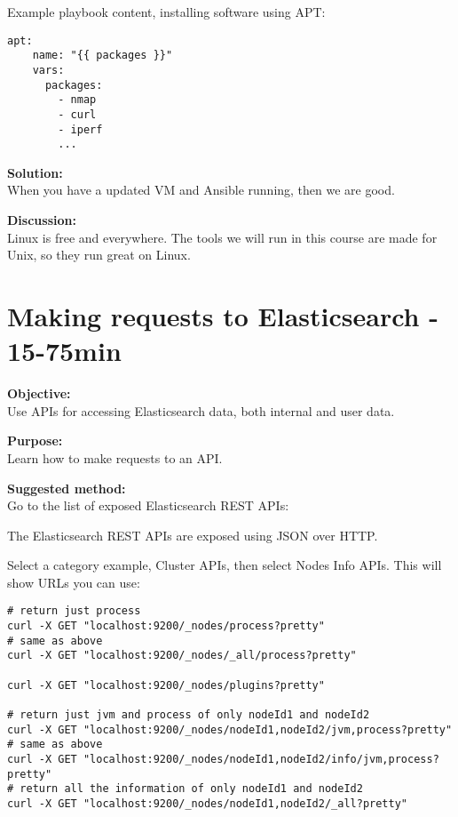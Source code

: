 \documentclass[a4paper,11pt,notitlepage]{report}
\begin{document}
Example playbook content, installing software using APT:
\begin{verbatim}
apt:
    name: "{{ packages }}"
    vars:
      packages:
        - nmap
        - curl
        - iperf
        ...
\end{verbatim}

{\bf Solution:}\\
When you have a updated VM and Ansible running, then we are good.

{\bf Discussion:}\\
Linux is free and everywhere. The tools we will run in this course are made for Unix, so they run great on Linux.


\chapter{Making requests to Elasticsearch - 15-75min}
\label{ex:es-rest-api}


{\bf Objective:}\\
Use APIs for accessing Elasticsearch data, both internal and user data.

{\bf Purpose:}\\
Learn how to make requests to an API.

{\bf Suggested method:}\\
Go to the list of exposed Elasticsearch REST APIs:\\

The Elasticsearch REST APIs are exposed using JSON over HTTP.

Select a category example, Cluster APIs, then select Nodes Info APIs. This will show URLs you can use:

\begin{verbatim}
# return just process
curl -X GET "localhost:9200/_nodes/process?pretty"
# same as above
curl -X GET "localhost:9200/_nodes/_all/process?pretty"

curl -X GET "localhost:9200/_nodes/plugins?pretty"

# return just jvm and process of only nodeId1 and nodeId2
curl -X GET "localhost:9200/_nodes/nodeId1,nodeId2/jvm,process?pretty"
# same as above
curl -X GET "localhost:9200/_nodes/nodeId1,nodeId2/info/jvm,process?pretty"
# return all the information of only nodeId1 and nodeId2
curl -X GET "localhost:9200/_nodes/nodeId1,nodeId2/_all?pretty"
\end{verbatim}
\end{document}
